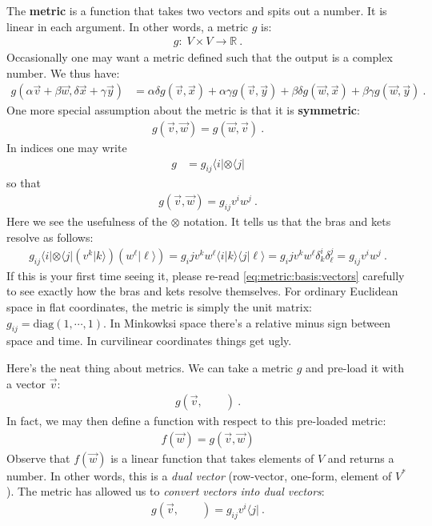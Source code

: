 The \textbf{metric} is a function that takes two vectors and spits out a number. It is linear in each argument. In other words, a metric $g$ is:
\begin{align}
  g:\; V\times V\to \mathbb{R} \ .
\end{align}
Occasionally one may want a metric defined such that the output is a complex number. We thus have:
\begin{align}
  g(\alpha \vec{v} + \beta\vec{w}, \delta \vec{x} + \gamma \vec{y})
  &= 
  \alpha \delta g(\vec{v},\vec{x}) + \alpha \gamma g(\vec{v},\vec{y}) + \beta\delta g(\vec{w},\vec{x}) + \beta\gamma g(\vec{w},\vec{y}) \ .
\end{align}
One more special assumption about the metric is that it is \textbf{symmetric}:
\begin{align}
  g(\vec{v},\vec{w}) = g(\vec{w}, \vec{v}) \ .
\end{align}
In indices one may write
\begin{align}
  g &= g_{ij} \langle i | \otimes \langle j |
\end{align}
so that
\begin{align}
  g(\vec{v}, \vec{w}) = g_{ij} v^{i}w^j \ .
 \end{align}
 Here we see the usefulness of the $\otimes$ notation. It tells us that the bras and kets resolve as follows:
 \begin{align}
   g_{ij}\langle i | \otimes \langle j | \left(v^k|k\rangle\right)\left(w^\ell|\ell\rangle\right) 
   = 
   g_ij v^k w^\ell 
   \langle i | k\rangle \langle j |\ell\rangle
   = 
   g_ij v^k w^\ell  \delta^i_k \delta^j_\ell 
   = 
   g_{ij} v^{i}w^j \ .
   \label{eq:metric:basis:vectors}
 \end{align}
 If this is your first time seeing it, please re-read \eqref{eq:metric:basis:vectors} carefully to see exactly how the bras and kets resolve themselves. 
 For ordinary Euclidean space in flat coordinates, the metric is simply the unit matrix: $g_{ij} = \text{diag}(1,\cdots, 1)$. In Minkowksi space there’s a relative minus sign between space and time. In curvilinear coordinates things get ugly. 
 
Here’s the neat thing about metrics. We can take a metric $g$ and pre-load it with a vector $\vec{v}$: 
\begin{align}
  g(\vec v,\qquad ) \ .
\end{align}
In fact, we may then define a function with respect to this pre-loaded metric:
\begin{align}
  f(\vec{w}) = g(\vec v,\vec w)
\end{align}
Observe that $f(\vec{w})$ is a linear function that takes elements of $V$ and returns a number. In other words, this is a \emph{dual vector} (row-vector, one-form, element of $V^*$). The metric has allowed us to \emph{convert vectors into dual vectors}:
\begin{align}
  g(\vec v,\qquad )  = g_{ij} v^i \langle j| \ .
\end{align}

